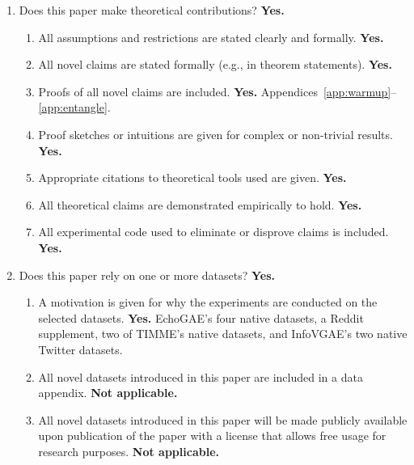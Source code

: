 \documentclass[letterpaper]{article} %
\begin{document}
\begin{enumerate}
\begin{enumerate}
  \item Did you describe steps taken to prevent or mitigate
    potential negative outcomes of the research, such as data
    and model documentation, data anonymization, responsible
    release, access control, and the reproducibility of
    findings? \textbf{Yes.} All code and preprocessing are
    released with the submission.
  \item Have you read the ethics review guidelines and ensured
    that your paper conforms to them? \textbf{Yes.}
  \end{enumerate}
\item Does this paper make theoretical contributions? \textbf{Yes.}
  \begin{enumerate}
  \item All assumptions and restrictions are stated clearly and
    formally. \textbf{Yes.}
  \item All novel claims are stated formally (e.g., in theorem
    statements). \textbf{Yes.}
  \item Proofs of all novel claims are included. \textbf{Yes.}
    Appendices~\ref{app:warmup}--\ref{app:entangle}.
  \item Proof sketches or intuitions are given for complex or
    non-trivial results. \textbf{Yes.}
  \item Appropriate citations to theoretical tools used are
    given. \textbf{Yes.}
  \item All theoretical claims are demonstrated empirically to
    hold. \textbf{Yes.}
  \item All experimental code used to eliminate or disprove
    claims is included. \textbf{Yes.}
  \end{enumerate}
\item Does this paper rely on one or more datasets? \textbf{Yes.}
  \begin{enumerate}
  \item A motivation is given for why the experiments are
    conducted on the selected datasets. \textbf{Yes.} EchoGAE's
    four native datasets, a Reddit supplement, two of TIMME's
    native datasets, and InfoVGAE's two native Twitter datasets.
  \item All novel datasets introduced in this paper are included
    in a data appendix. \textbf{Not applicable.}
  \item All novel datasets introduced in this paper will be made
    publicly available upon publication of the paper with a
    license that allows free usage for research purposes.
    \textbf{Not applicable.}

\end{enumerate}
\end{enumerate}
\end{document}
